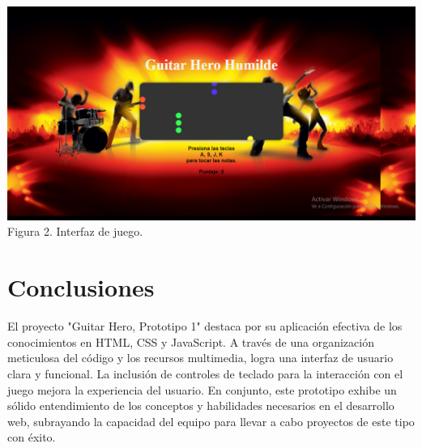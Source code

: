 \documentclass[conference]{IEEEtran}
\begin{document}
\centering
\includegraphics[width=1\linewidth]{Juego1.png}
Figura 2. Interfaz de juego.


\section{Conclusiones}

El proyecto "Guitar Hero, Prototipo 1" destaca por su aplicación efectiva de los conocimientos en HTML, CSS y JavaScript. A través de una organización meticulosa del código y los recursos multimedia, logra una interfaz de usuario clara y funcional. La inclusión de controles de teclado para la interacción con el juego mejora la experiencia del usuario. En conjunto, este prototipo exhibe un sólido entendimiento de los conceptos y habilidades necesarios en el desarrollo web, subrayando la capacidad del equipo para llevar a cabo proyectos de este tipo con éxito.


\end{document}
